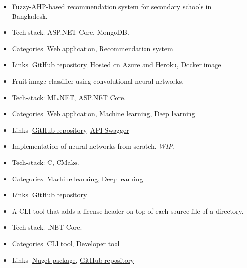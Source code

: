 \begin{itemize}
\item Fuzzy-AHP-based recommendation system for secondary schools in Bangladesh.
\item Tech-stack: ASP.NET Core, MongoDB.
\item Categories: Web application, Recommendation system.
\item Links: \href{https://github.com/maacpiash/KonSchool}{\underline{GitHub repository}}, Hosted on  \href{https://konschool.azurewebsites.net/}{\underline{Azure}} and \href{https://konschool.herokuapp.com}{\underline{Heroku}}, \href{https://hub.docker.com/r/maacpiash/konschool}{\underline{Docker image}}
\end{itemize}
\smallskip
{}
\begin{itemize}
\item Fruit-image-classifier using convolutional neural networks.
\item Tech-stack: ML.NET, ASP.NET Core.
\item Categories: Web application, Machine learning, Deep learning
\item Links: \href{https://github.com/maacpiash/Connery}{\underline{GitHub repository}}, \href{https://connery-api.herokuapp.com}{\underline{API Swagger}}
\end{itemize}
\smallskip
{}
\begin{itemize}
\item Implementation of neural networks from scratch. \textit{WIP}.
\item Tech-stack: C, CMake.
\item Categories: Machine learning, Deep learning
\item Links: \href{https://github.com/maacpiash/Winston}{\underline{GitHub repository}}
\end{itemize}
\smallskip
{}
\begin{itemize}
\item A CLI tool that adds a license header on top of each source file of a directory.
\item Tech-stack: .NET Core.
\item Categories: CLI tool, Developer tool
\item Links: \href{https://www.nuget.org/packages/AddLicenseHeader}{\underline{Nuget package}}, \href{https://github.com/maacpiash/addlh}{\underline{GitHub repository}}
\end{itemize}
\cvproject{}

